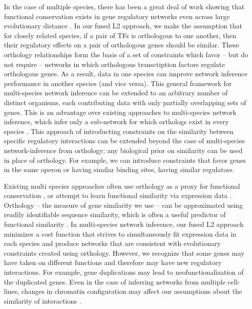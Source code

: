 \documentclass[11pt]{article}
\begin{document}
In the case of multiple species, there has been a great deal of work showing that functional conservation exists in gene regulatory networks even across large evolutionary distance \cite{satou2006gene, hinman2009evolution,tanay2005conservation,erwin2009evolution}. In our fused L2 approach, we make the assumption that for closely related species, if a pair of TFs is orthologous to one another, then their regulatory effects on a pair of orthologous genes should be similar. These orthology relationships form the basis of a set of constraints which favor -- but do not require -- networks in which orthologous transctiption factors regulate orthologous genes. As a result, data in one species can improve network inference performance in another species  (and vice versa). This general framework for multi-species network inference can be extended to an arbitrary number of distinct organisms, each contributing data with only partially overlapping sets of genes. This is an advantage over existing approaches to multi-species network inference, which infer only a sub-network for which orthologs exist in every species \cite{joshi_multi-species_2015}. This approach of introducting constraints on the similarity between specific regulatory interactions can be extended beyond the case of multi-species network-inference from orthology; any biological prior on similarity can be used in place of orthology. For example, we can introduce constraints that favor genes in the same operon or having similar binding sites, having similar regulators.

Existing multi species approaches often use orthology as a proxy for functional conservation \cite{penfold_inferring_2015, joshi_multi-species_2015, kashima_simultaneous_2009, zhang2010nearly}, or attempt to learn functional similarity via expression data \cite{gholami_cross-species_2010}. Orthology -- the measure of gene similarity we use -- can be approximated using readily identifiable sequence similarity, which is often a useful predictor of functional similarity \cite{wilson_assessing_2000}. In multi-species network inference, our fused L2 approach minimizes a cost function that strives to simultaneously fit expression data in each species and produce networks that are consistent with evolutionary constraints created using orthology. However, we recognize that some genes may have taken on different functions and therefore may have new regulatory interactions. For example, gene duplications may lead to neofunctionalization \cite{eisen_phylogenomics:_1998} of the duplicated genes. Even in the case of inferring networks from multiple cell-lines, changes in chromatin configuration may affect our assumptions about the similarity of interactions \cite{li_role_2007}.
\end{document}
